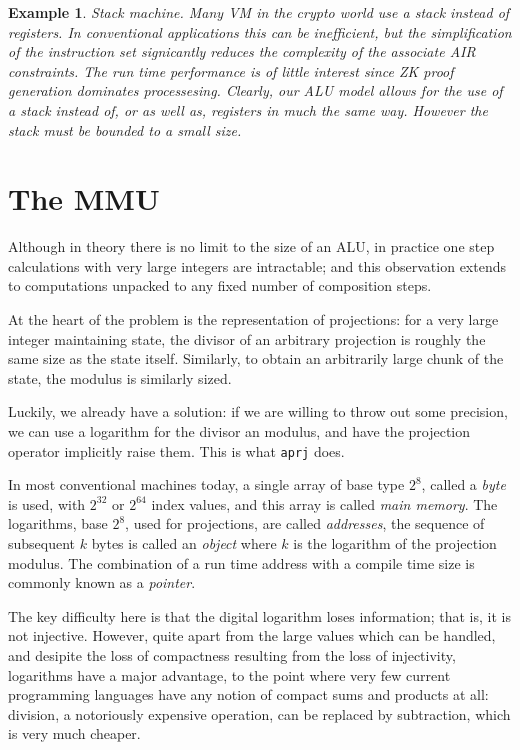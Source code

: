 \documentclass[oneside]{book}
\theoremstyle{plain}
\newtheorem{example}{Example}
\theoremstyle{definition}
\theoremstyle{plain}
\begin{document}
\begin{example}
{\em Stack machine.} Many VM in the crypto world use a stack instead
of registers. In conventional applications this can be inefficient,
but the simplification of the instruction set signicantly reduces
the complexity of the associate AIR constraints. The run time performance
is of little interest since ZK proof generation dominates processesing.
Clearly, our ALU model allows for the use of a stack instead of, or as
well as, registers in much the same way. However the stack must be bounded
to a small size.
\end{example}

\section{The MMU}
Although in theory there is no limit to the size of an ALU,
in practice one step calculations with very large integers
are intractable; and this observation extends to computations
unpacked to any fixed number of composition steps.

At the heart of the problem is the representation of projections:
for a very large integer maintaining state, the divisor of an
arbitrary projection is roughly the same size as the state itself.
Similarly, to obtain an arbitrarily large chunk of the state,
the modulus is similarly sized.

Luckily, we already have a solution: if we are willing to throw
out some precision, we can use a logarithm for the divisor an
modulus, and have the projection operator implicitly raise them.
This is what \verb$aprj$ does. 

In most conventional machines today, a single array of base
type $2^8$, called a {\em byte} is used, with $2^{32}$ or $2^{64}$
index values, and this array is called {\em main memory}.
The logarithms, base $2^8$, used for projections, are called 
{\em addresses}, the sequence of subsequent $k$ bytes is called
an {\em object} where $k$ is the logarithm of the projection modulus.
The combination of a run time address with a compile time size is 
commonly known as a {\em pointer}.

The key difficulty here is that the digital logarithm loses information;
that is, it is not injective. However, quite apart from the large values
which can be handled, and desipite the loss of compactness resulting from
the loss of injectivity, logarithms have a major advantage, to the point
where very few current programming languages have any notion
of compact sums and products at all: division, a notoriously expensive
operation, can be replaced by subtraction, which is very much cheaper.
\end{document}

